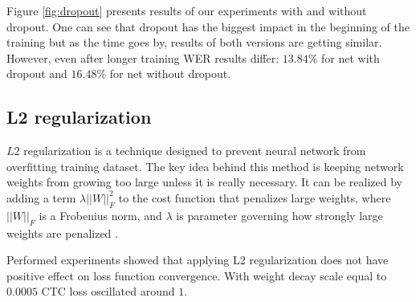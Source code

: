 \documentclass[licencjacka,en]{pracamgr}
\begin{document}
	
	
	\noindent%
	\begin{minipage}{\linewidth}%
		\label{fig:dropout}		     
	\end{minipage}
	
	Figure \ref{fig:dropout} presents results of our experiments with and without dropout. One can see that dropout has the biggest impact in the beginning of the training but as the time goes by, results of both versions are getting similar. However, even after longer training WER results differ: $13.84$\% for net with dropout and $16.48$\% for net without dropout.
	
	
	\subsection{L2 regularization}
	$L2$ regularization is a technique designed to prevent neural network from overfitting training dataset. The key idea behind this method is keeping network weights from growing too large unless it is really necessary. It can be realized by adding a term $\lambda ||W||^2_F $ to the cost function that penalizes large weights, where $||W||_F $ is
	a Frobenius norm, and $\lambda$ is parameter governing how strongly large weights are penalized \cite{L2}.
	
	Performed experiments showed that applying L2 regularization does not have positive effect on loss function convergence. With weight decay scale equal to $0.0005$ CTC loss oscillated around $1$.
	
\end{document}
